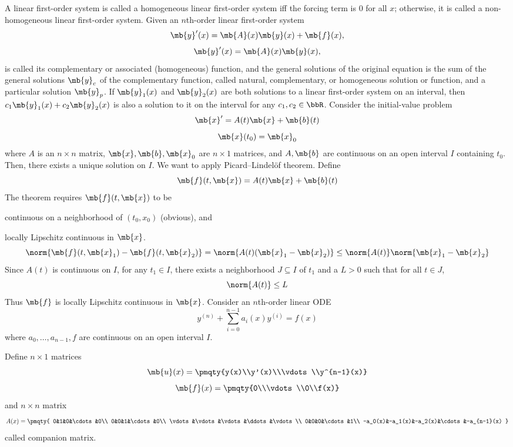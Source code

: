 \documentclass[a4paper,12pt]{report}
\begin{document}
A linear first-order system is called a homogeneous linear first-order system iff the forcing term is 0 for all $x$; otherwise, it is called a non-homogeneous linear first-order system.
Given an $n$th-order linear first-order system 
\[\mb{y}'(x)=\mb{A}(x)\mb{y}(x)+\mb{f}(x),\]
\[\mb{y}'(x)=\mb{A}(x)\mb{y}(x),\]
is called its complementary or associated (homogeneous) function, and the general solutions of the original equation is the sum of the general solutions $\mb{y}_c$ of the complementary function, called natural, complementary, or homogeneous solution or function, and a particular solution $\mb{y}_p$.
If $\mb{y}_1(x)$ and $\mb{y}_2(x)$ are both solutions to a linear first-order system on an interval, then $c_1\mb{y}_1(x)+c_2\mb{y}_2(x)$ is also a solution to it on the interval for any $c_1,c_2\in\bbR$.
Consider the initial-value problem
\[\mb{x}'=A(t)\mb{x}+\mb{b}(t)\]
\[\mb{x}(t_0)=\mb{x}_0\]
where $A$ is an $n\times n$ matrix, $\mb{x},\mb{b},\mb{x}_0$ are $n\times 1$ matrices, and $A,\mb{b}$ are continuous on an open interval $I$ containing $t_0$. Then, there exists a unique solution on $I$.
\bpr
We want to apply Picard–Lindelöf theorem. Define
\[\mb{f}(t,\mb{x})=A(t)\mb{x}+\mb{b}(t)\]
The theorem requires $\mb{f}(t,\mb{x})$ to be
\bit
\item continuous on a neighborhood of $(t_0,x_0)$ (obvious), and
\item locally Lipschitz continuous in $\mb{x}$.
\eit
\[\norm{\mb{f}(t,\mb{x}_1)-\mb{f}(t,\mb{x}_2)}=\norm{A(t)(\mb{x}_1-\mb{x}_2)}\le\norm{A(t)}\norm{\mb{x}_1-\mb{x}_2}\]
Since $A(t)$ is continuous on $I$, for any $t_1\in I$, there exists a neighborhood $J\subseteq I$ of $t_1$ and a $L>0$ such that for all $t\in J$,
\[\norm{A(t)}\le L\]
Thus $\mb{f}$ is locally Lipschitz continuous in $\mb{x}$.
\epr
{}
Consider an $n$th-order linear ODE
\[y^{(n)}+\sum_{i=0}^{n-1}a_i(x)y^{(i)}=f(x)\]
where $a_0,\ldots,a_{n-1},f$ are continuous on an open interval $I$.

Define $n\times 1$ matrices
\[\mb{u}(x)=\pmqty{y(x)\\y'(x)\\\vdots\\y^{n-1}(x)}\]
\[\mb{f}(x)=\pmqty{0\\\vdots\\0\\f(x)}\]
and $n\times n$ matrix
\[A(x)=\pmqty{
0&1&0&\cdots&0\\
0&0&1&\cdots&0\\
\vdots&\vdots&\vdots&\ddots&\vdots\\
0&0&0&\cdots&1\\
-a_0(x)&-a_1(x)&-a_2(x)&\cdots&-a_{n-1}(x)
}\]
called companion matrix.
\end{document}
